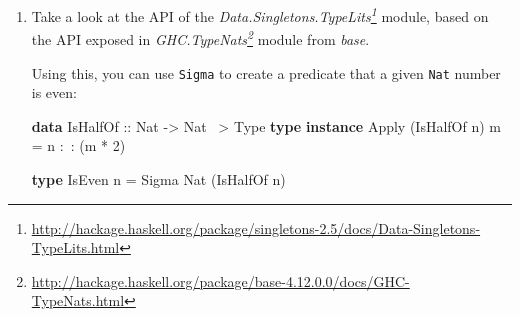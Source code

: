 \documentclass[]{article}
\newenvironment{Shaded}{}{}
\newcommand{\DataTypeTok}[1]{\textcolor[rgb]{0.56,0.13,0.00}{#1}}
\newcommand{\DecValTok}[1]{\textcolor[rgb]{0.25,0.63,0.44}{#1}}
\newcommand{\FunctionTok}[1]{\textcolor[rgb]{0.02,0.16,0.49}{#1}}
\newcommand{\KeywordTok}[1]{\textcolor[rgb]{0.00,0.44,0.13}{\textbf{#1}}}
\newcommand{\NormalTok}[1]{#1}
\newcommand{\OtherTok}[1]{\textcolor[rgb]{0.00,0.44,0.13}{#1}}
\renewcommand{\href}[2]{#2\footnote{\url{#1}}}
\begin{document}
\begin{enumerate}
  will contain a \texttt{Door} that must be knockable.

  Try doing it for both (a) the ``dependent proof'' version (with the
  \texttt{Knockable} data type) and for (b) the type family version (with the
  \texttt{StatePass} type family).

  \href{https://github.com/mstksg/inCode/tree/master/code-samples/singletons/Door4Final.hs\#L192-L192}{Solutions
  here!} I gave four different ways of doing it, for a full range of manual
  vs.~auto-promoted defunctionalization symbols and \texttt{Knockable} vs.
  \texttt{Pass}-based methods.

  \emph{Hint:} Look at the definition of \texttt{SomeDoor} in terms of
  \texttt{Sigma}:

\begin{Shaded}
\begin{Highlighting}[]
\KeywordTok{type} \DataTypeTok{SomeDoor} \FunctionTok{=} \DataTypeTok{Sigma} \DataTypeTok{DoorState}\NormalTok{ (}\DataTypeTok{TyCon1} \DataTypeTok{Door}\NormalTok{)}
\end{Highlighting}
\end{Shaded}

  \emph{Hint}: Try having \texttt{KnockableDoor} return a tuple.
\item
  Take a look at the API of the
  \emph{\href{http://hackage.haskell.org/package/singletons-2.5/docs/Data-Singletons-TypeLits.html}{Data.Singletons.TypeLits}}
  module, based on the API exposed in
  \emph{\href{http://hackage.haskell.org/package/base-4.12.0.0/docs/GHC-TypeNats.html}{GHC.TypeNats}}
  module from \emph{base}.

  Using this, you can use \texttt{Sigma} to create a predicate that a given
  \texttt{Nat} number is even:

\begin{Shaded}
\begin{Highlighting}[]
\KeywordTok{data} \DataTypeTok{IsHalfOf}\OtherTok{ ::} \DataTypeTok{Nat} \OtherTok{->} \DataTypeTok{Nat} \FunctionTok{~>} \DataTypeTok{Type}
\KeywordTok{type} \KeywordTok{instance} \DataTypeTok{Apply}\NormalTok{ (}\DataTypeTok{IsHalfOf}\NormalTok{ n) m }\FunctionTok{=}\NormalTok{ n }\FunctionTok{:~:}\NormalTok{ (m }\FunctionTok{*} \DecValTok{2}\NormalTok{)}

\KeywordTok{type} \DataTypeTok{IsEven}\NormalTok{ n }\FunctionTok{=} \DataTypeTok{Sigma} \DataTypeTok{Nat}\NormalTok{ (}\DataTypeTok{IsHalfOf}\NormalTok{ n)}
\end{Highlighting}
\end{Shaded}


\end{enumerate}
\end{document}
